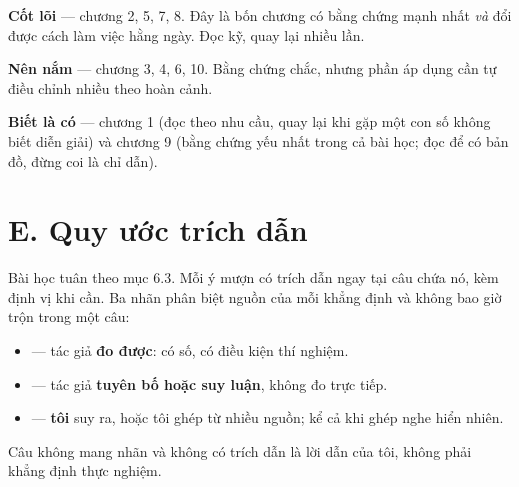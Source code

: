 \documentclass[hieu-suat.tex]{subfiles}
\begin{document}
\textbf{Cốt lõi}  --- chương 2, 5, 7, 8. Đây là bốn chương có bằng chứng mạnh nhất \emph{và} đổi được cách làm việc hằng ngày. Đọc kỹ, quay lại nhiều lần.

\textbf{Nên nắm}  --- chương 3, 4, 6, 10. Bằng chứng chắc, nhưng phần áp dụng cần tự điều chỉnh nhiều theo hoàn cảnh.

\textbf{Biết là có}  --- chương 1 (đọc theo nhu cầu, quay lại khi gặp một con số không biết diễn giải) và chương 9 (bằng chứng yếu nhất trong cả bài học; đọc để có bản đồ, đừng coi là chỉ dẫn).

\section*{E. Quy ước trích dẫn}

Bài học tuân theo  mục 6.3. Mỗi ý mượn có trích dẫn ngay tại câu chứa nó, kèm định vị khi cần. Ba nhãn phân biệt nguồn của mỗi khẳng định và không bao giờ trộn trong một câu:

\begin{itemize}
\item \nD{} --- tác giả \textbf{đo được}: có số, có điều kiện thí nghiệm.
\item \nT{} --- tác giả \textbf{tuyên bố hoặc suy luận}, không đo trực tiếp.
\item \nM{} --- \textbf{tôi} suy ra, hoặc tôi ghép từ nhiều nguồn; kể cả khi ghép nghe hiển nhiên.
\end{itemize}

Câu không mang nhãn và không có trích dẫn là lời dẫn của tôi, không phải khẳng định thực nghiệm.
\end{document}
